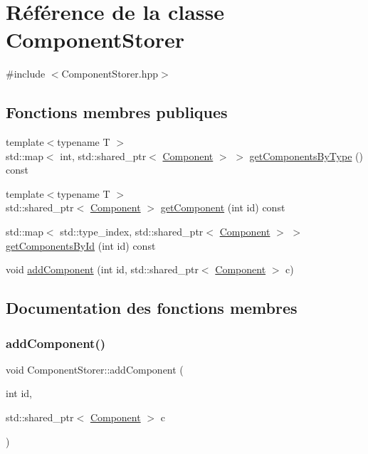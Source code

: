 \hypertarget{classComponentStorer}{}\section{Référence de la classe Component\+Storer}
\label{classComponentStorer}


{\ttfamily \#include $<$Component\+Storer.\+hpp$>$}

\subsection*{Fonctions membres publiques}
\begin{DoxyCompactItemize}
\item 
{\footnotesize template$<$typename T $>$ }\\std\+::map$<$ int, std\+::shared\+\_\+ptr$<$ \hyperlink{structComponent}{Component} $>$ $>$ \hyperlink{classComponentStorer_abd4fb0cfe30b69e8102e52f66dc35c7a}{get\+Components\+By\+Type} () const
\item 
{\footnotesize template$<$typename T $>$ }\\std\+::shared\+\_\+ptr$<$ \hyperlink{structComponent}{Component} $>$ \hyperlink{classComponentStorer_a817c23e85158ef1fc49592ecd4a02b81}{get\+Component} (int id) const
\item 
std\+::map$<$ std\+::type\+\_\+index, std\+::shared\+\_\+ptr$<$ \hyperlink{structComponent}{Component} $>$ $>$ \hyperlink{classComponentStorer_a32a2e59c11c6d4a73ecec277775225a2}{get\+Components\+By\+Id} (int id) const
\item 
void \hyperlink{classComponentStorer_a563e726b89bb522b40e564cf11f68bda}{add\+Component} (int id, std\+::shared\+\_\+ptr$<$ \hyperlink{structComponent}{Component} $>$ c)
\end{DoxyCompactItemize}


\subsection{Documentation des fonctions membres}
\mbox{\label{classComponentStorer_a563e726b89bb522b40e564cf11f68bda}} 
\subsubsection{\texorpdfstring{add\+Component()}{addComponent()}}
{\footnotesize\ttfamily void Component\+Storer\+::add\+Component (\begin{DoxyParamCaption}\item[{int}]{id,  }\item[{std\+::shared\+\_\+ptr$<$ \hyperlink{structComponent}{Component} $>$}]{c }\end{DoxyParamCaption})}

